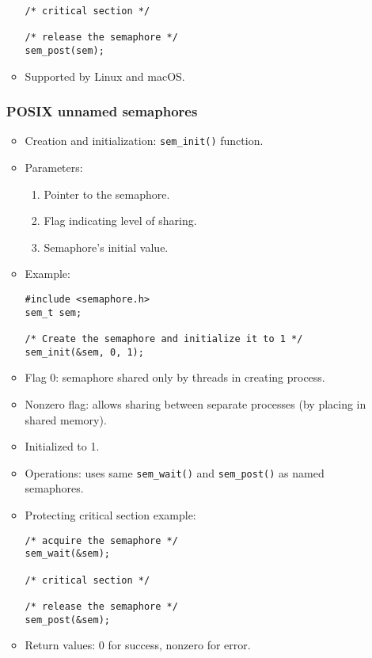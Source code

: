 \begin{itemize}
\begin{itemize}
\begin{verbatim}
/* critical section */
 
/* release the semaphore */
sem_post(sem);
        \end{verbatim}
        \item Supported by Linux and macOS.
    \end{itemize}

    \subsubsection{POSIX unnamed semaphores}
    \begin{itemize}
        \item Creation and initialization: \texttt{sem\_init()} function.
        \item Parameters:
        \begin{enumerate}
            \item Pointer to the semaphore.
            \item Flag indicating level of sharing.
            \item Semaphore's initial value.
        \end{enumerate}
        \item Example:
        \begin{verbatim}
#include <semaphore.h>
sem_t sem;
 
/* Create the semaphore and initialize it to 1 */
sem_init(&sem, 0, 1);
        \end{verbatim}
        \item Flag 0: semaphore shared only by threads in creating process.
        \item Nonzero flag: allows sharing between separate processes (by placing in shared memory).
        \item Initialized to 1.
        \item Operations: uses same \texttt{sem\_wait()} and \texttt{sem\_post()} as named semaphores.
        \item Protecting critical section example:
        \begin{verbatim}
/* acquire the semaphore */
sem_wait(&sem);
 
/* critical section */
 
/* release the semaphore */
sem_post(&sem);
        \end{verbatim}
        \item Return values: 0 for success, nonzero for error.
    \end{itemize}
\end{itemize}

